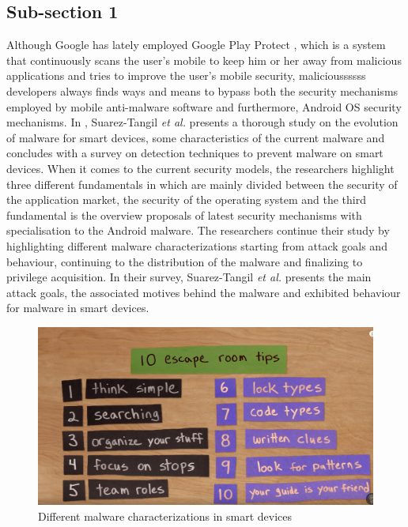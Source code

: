 \documentclass{mscreport}
\begin{document}
\subsection{Sub-section 1}

Although Google has lately employed Google Play Protect \cite{GooglePlayP2017},   which is a system that continuously scans the user's mobile to keep him or her away from malicious applications and tries to improve the user's mobile security, malicioussssss developers always finds ways and means to bypass both the security mechanisms employed by mobile anti-malware software and furthermore, Android OS security mechanisms. In \cite{SuarezTangil2014}, Suarez-Tangil \textit{et al.} presents a thorough study on the evolution of malware for smart devices, some characteristics of the current malware and concludes with a survey on detection techniques to prevent malware on smart devices. When it comes to the current security models, the researchers highlight three different fundamentals in which are mainly divided between the security of the application market, the security of the operating system and the third fundamental is the overview proposals of latest security mechanisms with specialisation to the Android malware. The researchers continue their study by highlighting different malware characterizations starting from attack goals and behaviour, continuing to the distribution of the malware and finalizing to privilege acquisition. In their survey, Suarez-Tangil \textit{et al.} presents the main attack goals, the associated motives behind the malware and exhibited behaviour for malware in smart devices. \newline

\begin{figure}[h!]
\begin{center}
\includegraphics[scale=0.4]{../images/figure_1.png} 
\caption{Different malware characterizations in smart devices \cite{SuarezTangil2014}}
\label{Figure 1: Different malware characterizations in smart devices }
\end{center}
\end{figure}
\end{document}
